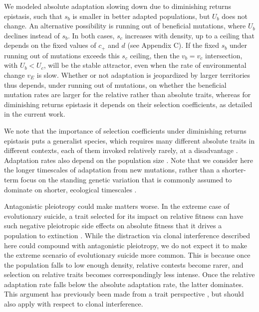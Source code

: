 \documentclass[9pt,twocolumn,twoside,lineno]{gsajnl}
\begin{document}
We modeled absolute adaptation slowing down due to diminishing returns epistasis, such that $s_b$ is smaller in better adapted populations, but $U_b$ does not change. An alternative possibility is running out of beneficial mutations, where $U_b$ declines instead of $s_b$. In both cases, $s_c$ increases with density, up to a ceiling that depends on the fixed values of $c_+$ and $d$ (see Appendix C). If the fixed $s_b$ under running out of mutations exceeds this $s_c$ ceiling, then the $v_b=v_c$ intersection, with $U_b < U_c$, will be the stable attractor, even when the rate of environmental change $v_E$ is slow. Whether or not adaptation is jeopardized by larger territories thus depends, under running out of mutations, on whether the beneficial mutation rates are larger for the relative rather than absolute traits, whereas for diminishing returns epistasis it depends on their selection coefficients, as detailed in the current work. 

We note that the importance of selection coefficients under diminishing returns epistasis puts a generalist species, which requires many different absolute traits in different contexts, each of them invoked relatively rarely, at a disadvantage \citep{SnellRood2010,Draghi2021,Whitlock1996,Kawecki1998}. Adaptation rates also depend on the population size \citep{Lanfearetal2014}. Note that we consider here the longer timescales of adaptation from new mutations, rather than a shorter-term focus on the standing genetic variation that is commonly assumed to dominate on shorter, ecological timescales \citep{Hoffmann2017}.

Antagonistic pleiotropy could make matters worse. In the extreme case of evolutionary suicide, a trait selected for its impact on relative fitness can have such negative pleiotropic side effects on absolute fitness that it drives a population to extinction \citep{JRankin2005,Niehus2021,Ferriere2013}. While the distraction via clonal interference described here could compound with antagonistic pleiotropy, we do not expect it to make the extreme scenario of evolutionary suicide more common. This is because once the population falls to low enough density, relative contests become rarer, and selection on relative traits becomes correspondingly less intense. Once the relative adaptation rate falls below the absolute adaptation rate, the latter dominates. This argument has previously been made from a trait perspective \citep{Rankin2007tragedyOfCommons,Yamamichietal2020}, but should also apply with respect to clonal interference.
\end{document}
